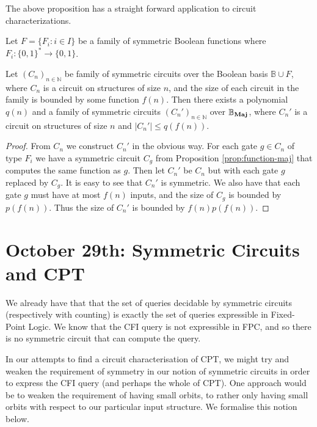 \documentclass[12pt]{report}
\newcommand{\maj}{\text{\textbf{Maj}}}
\begin{document}
The above proposition has a straight forward application to circuit
characterizations.

\begin{prop}
  Let $F = \{F_i : i \in I \}$ be a family of symmetric Boolean functions where
  $F_i: \{0,1\}^* \rightarrow \{ 0,1 \}$.

  Let $(C_n)_{n \in \mathbb{N}}$ be family of symmetric circuits over the
  Boolean basis $\mathbb{B} \cup F$, where $C_n$ is a circuit on structures of
  size $n$, and the size of each circuit in the family is bounded by some
  function $f(n)$. Then there exists a polynomial $q(n)$ and a family of
  symmetric circuits $(C_n')_{n \in \mathbb{N}}$ over $\mathbb{B}_\maj$, where
  $C_n'$ is a circuit on structures of size $n$ and $\vert C_n' \vert \leq
  q(f(n))$.
\end{prop}

\begin{proof}
  From $C_n$ we construct $C_n'$ in the obvious way. For each gate $g \in C_n$
  of type $F_i$ we have a symmetric circuit $C_g$ from Proposition
  \ref{prop:function-maj} that computes the same function as $g$. Then let
  $C_n'$ be $C_n$ but with each gate $g$ replaced by $C_g$. It is easy to see
  that $C_n'$ is symmetric. We also have that each gate $g$ must have at most
  $f(n)$ inputs, and the size of $C_g$ is bounded by $p(f(n))$. Thus the size of
  $C_n'$ is bounded by $f(n)p(f(n))$.
\end{proof}

\chapter{October 29th: Symmetric Circuits and CPT}

We already have that that the set of queries decidable by symmetric
circuits (respectively with counting) is exactly the set of queries
expressible in Fixed-Point Logic. We know that the CFI query is not
expressible in FPC, and so there is no symmetric circuit that can
compute the query. 

In our attempts to find a circuit characterisation of CPT, we might try and weaken the requirement of symmetry in our notion of symmetric circuits in order to express the CFI query (and perhaps the whole of CPT). One approach would be to weaken the requirement of having small orbits, to rather only having small orbits with respect to our particular input structure. We formalise this notion below.
\end{document}

